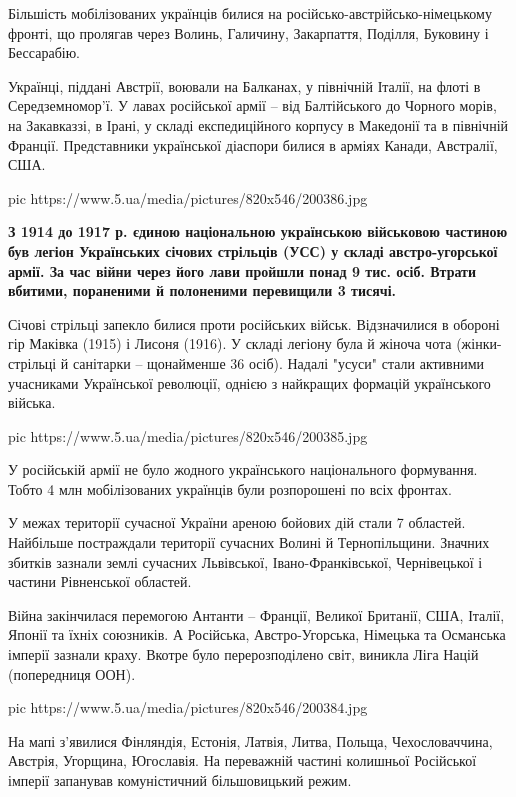 Більшість мобілізованих українців билися на
російсько-австрійсько-німецькому фронті, що пролягав через Волинь,
Галичину, Закарпаття, Поділля, Буковину і Бессарабію.

Українці, піддані Австрії, воювали на Балканах, у північній Італії, на
флоті в Середземномор'ї. У лавах російської армії – від Балтійського до
Чорного морів, на Закавказзі, в Ірані, у складі експедиційного корпусу в
Македонії та в північній Франції. Представники української діаспори билися
в арміях Канади, Австралії, США.

\ifcmt
pic https://www.5.ua/media/pictures/820x546/200386.jpg
\fi

\begin{leftbar}
	\bfseries
З 1914 до 1917 р. єдиною національною українською військовою частиною
був легіон Українських січових стрільців (УСС) у складі австро-угорської
армії. За час війни через його лави пройшли понад 9 тис. осіб. Втрати
вбитими, пораненими й полоненими перевищили 3 тисячі.
\end{leftbar}

Січові стрільці запекло билися проти російських військ. Відзначилися в
обороні гір Маківка (1915) і Лисоня (1916). У складі легіону була й жіноча
чота (жінки-стрільці й санітарки – щонайменше 36 осіб). Надалі "усуси"
стали активними учасниками Української революції, однією з найкращих
формацій українського війська.

\ifcmt
pic https://www.5.ua/media/pictures/820x546/200385.jpg
\fi

У російській армії не було жодного українського національного формування.
Тобто 4 млн мобілізованих українців були розпорошені по всіх фронтах.

У межах території сучасної України ареною бойових дій стали 7 областей.
Найбільше постраждали території сучасних Волині й Тернопільщини. Значних
збитків зазнали землі сучасних Львівської, Івано-Франківської,
Чернівецької і частини Рівненської областей.

Війна закінчилася перемогою Антанти – Франції, Великої Британії, США,
Італії, Японії та їхніх союзників. А Російська, Австро-Угорська, Німецька
та Османська імперії зазнали краху. Вкотре було перерозподілено світ,
виникла Ліга Націй (попередниця ООН).

\ifcmt
pic https://www.5.ua/media/pictures/820x546/200384.jpg
\fi

На мапі з'явилися Фінляндія, Естонія, Латвія, Литва, Польща,
Чехословаччина, Австрія, Угорщина, Югославія. На переважній частині
колишньої Російської імперії запанував комуністичний більшовицький режим. 

